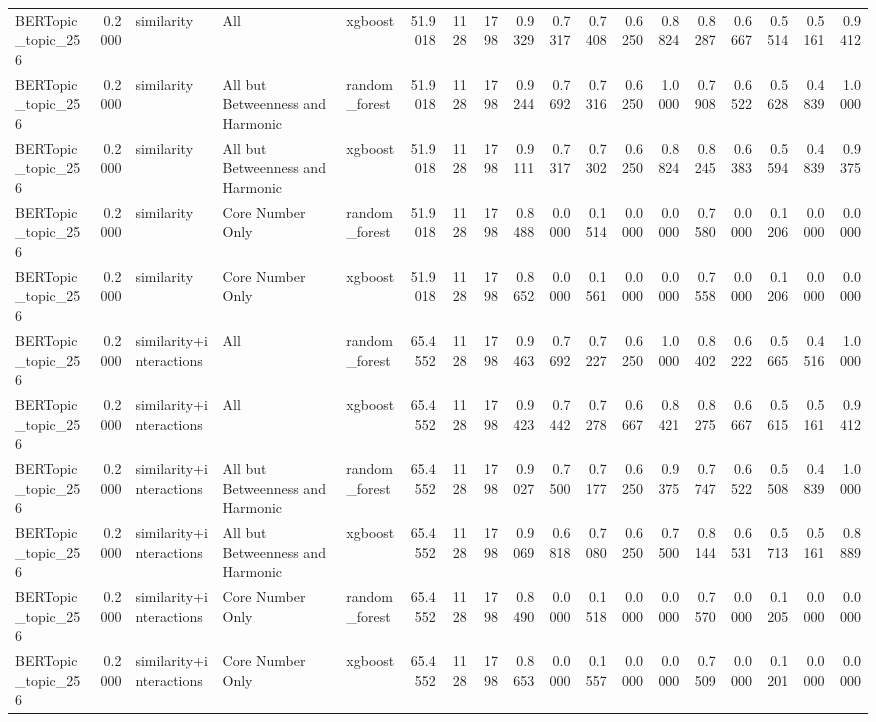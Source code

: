 \begin{tabular}{lrlllrrrrrrrrrrrrr}
BERTopic_topic_256 & 0.2000 & similarity & All & xgboost & 51.9018 & 1128 & 1798 & 0.9329 & 0.7317 & 0.7408 & 0.6250 & 0.8824 & 0.8287 & 0.6667 & 0.5514 & 0.5161 & 0.9412 \\
BERTopic_topic_256 & 0.2000 & similarity & All but Betweenness and Harmonic & random_forest & 51.9018 & 1128 & 1798 & 0.9244 & 0.7692 & 0.7316 & 0.6250 & 1.0000 & 0.7908 & 0.6522 & 0.5628 & 0.4839 & 1.0000 \\
BERTopic_topic_256 & 0.2000 & similarity & All but Betweenness and Harmonic & xgboost & 51.9018 & 1128 & 1798 & 0.9111 & 0.7317 & 0.7302 & 0.6250 & 0.8824 & 0.8245 & 0.6383 & 0.5594 & 0.4839 & 0.9375 \\
BERTopic_topic_256 & 0.2000 & similarity & Core Number Only & random_forest & 51.9018 & 1128 & 1798 & 0.8488 & 0.0000 & 0.1514 & 0.0000 & 0.0000 & 0.7580 & 0.0000 & 0.1206 & 0.0000 & 0.0000 \\
BERTopic_topic_256 & 0.2000 & similarity & Core Number Only & xgboost & 51.9018 & 1128 & 1798 & 0.8652 & 0.0000 & 0.1561 & 0.0000 & 0.0000 & 0.7558 & 0.0000 & 0.1206 & 0.0000 & 0.0000 \\
BERTopic_topic_256 & 0.2000 & similarity+interactions & All & random_forest & 65.4552 & 1128 & 1798 & 0.9463 & 0.7692 & 0.7227 & 0.6250 & 1.0000 & 0.8402 & 0.6222 & 0.5665 & 0.4516 & 1.0000 \\
BERTopic_topic_256 & 0.2000 & similarity+interactions & All & xgboost & 65.4552 & 1128 & 1798 & 0.9423 & 0.7442 & 0.7278 & 0.6667 & 0.8421 & 0.8275 & 0.6667 & 0.5615 & 0.5161 & 0.9412 \\
BERTopic_topic_256 & 0.2000 & similarity+interactions & All but Betweenness and Harmonic & random_forest & 65.4552 & 1128 & 1798 & 0.9027 & 0.7500 & 0.7177 & 0.6250 & 0.9375 & 0.7747 & 0.6522 & 0.5508 & 0.4839 & 1.0000 \\
BERTopic_topic_256 & 0.2000 & similarity+interactions & All but Betweenness and Harmonic & xgboost & 65.4552 & 1128 & 1798 & 0.9069 & 0.6818 & 0.7080 & 0.6250 & 0.7500 & 0.8144 & 0.6531 & 0.5713 & 0.5161 & 0.8889 \\
BERTopic_topic_256 & 0.2000 & similarity+interactions & Core Number Only & random_forest & 65.4552 & 1128 & 1798 & 0.8490 & 0.0000 & 0.1518 & 0.0000 & 0.0000 & 0.7570 & 0.0000 & 0.1205 & 0.0000 & 0.0000 \\
BERTopic_topic_256 & 0.2000 & similarity+interactions & Core Number Only & xgboost & 65.4552 & 1128 & 1798 & 0.8653 & 0.0000 & 0.1557 & 0.0000 & 0.0000 & 0.7509 & 0.0000 & 0.1201 & 0.0000 & 0.0000 \\

\end{tabular}
